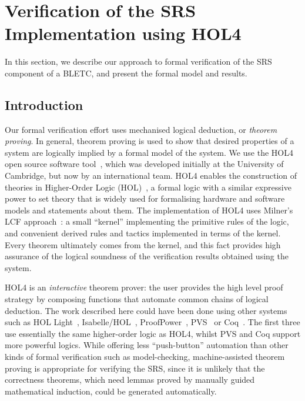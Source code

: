 \documentclass{llncs}
\begin{document}
\section{Verification of the SRS Implementation using HOL4}
\label{sec-verification}

In this section, we describe our approach to formal verification of the SRS component of a BLETC, and present the formal model and results.

\subsection{Introduction}
Our formal verification effort uses mechanised logical deduction, or \emph{theorem proving}.
In general, theorem proving is used to show that desired properties of a system are logically implied by a formal model of the system.
We use the HOL4 open source software tool~\cite{HOL4,DBLP:conf/tphol/SlindN08}, which was developed initially at the University of Cambridge, but now by an international team.
HOL4 enables the construction of theories in Higher-Order Logic (HOL)~\cite{DBLP:journals/jsyml/Church40}, a formal logic with a similar expressive power to set theory that is widely used for formalising hardware and software models and statements about them.
The implementation of HOL4 uses Milner's LCF approach~\cite{Milner:1972:LCF:891954}: a small ``kernel'' implementing the primitive rules of the logic, and convenient derived rules and tactics implemented in terms of the kernel.
Every theorem ultimately comes from the kernel, and this fact provides high assurance of the logical soundness of the verification results obtained using the system.

HOL4 is an \emph{interactive} theorem prover: the user provides the high level proof strategy by composing functions that automate common chains of logical deduction.
The work described here could have been done using other systems such as HOL Light~\cite{HOLLight}, Isabelle/HOL~\cite{Isabelle}, ProofPower~\cite{ProofPower}, PVS~\cite{PVS} or Coq~\cite{Coq}.
The first three use essentially the same higher-order logic as HOL4, whilst PVS and Coq support more powerful logics.
While offering less ``push-button'' automation than other kinds of formal verification such as model-checking, machine-assisted theorem proving is appropriate for verifying the SRS, since it is unlikely that the correctness theorems, which need lemmas proved by manually guided mathematical induction, could be generated automatically.
\end{document}
